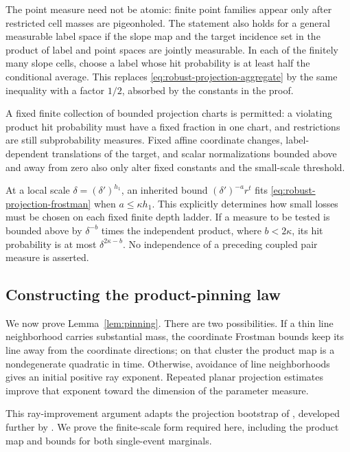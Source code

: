 \begin{remark}
\label{rem:robust-projection-extensions}
The point measure need not be atomic: finite point families
appear only after restricted cell masses are pigeonholed. The
statement also holds for a general measurable label space if
the slope map and the target incidence set in the product of
label and point spaces are jointly measurable. In each of the
finitely many slope cells, choose a label whose hit probability
is at least half the conditional average. This replaces
\eqref{eq:robust-projection-aggregate} by the same inequality
with a factor $1/2$, absorbed by the constants in the proof.

A fixed finite collection of bounded projection charts is
permitted: a violating product hit probability must have a
fixed fraction in one chart, and restrictions are still
subprobability measures. Fixed affine coordinate changes,
label-dependent translations of the target, and scalar
normalizations bounded above and away from zero also only
alter fixed constants and the small-scale threshold.

At a local scale $\delta=(\delta')^{h_1}$, an inherited bound
$(\delta')^{-a}r^t$ fits
\eqref{eq:robust-projection-frostman} when $a\le\kappa h_1$.
This explicitly determines how small losses must be chosen
on each fixed finite depth ladder. If a measure to be tested
is bounded above by $\delta^{-b}$ times the independent product,
where $b<2\kappa$, its hit probability is at most
$\delta^{2\kappa-b}$. No independence of a preceding coupled
pair measure is asserted.
\end{remark}


\subsection{Constructing the product-pinning law}
\label{sec:product-pinning-proof}

We now prove Lemma~\ref{lem:pinning}. There are two possibilities.
If a thin line neighborhood carries substantial mass, the coordinate
Frostman bounds keep its line away from the coordinate directions;
on that cluster the product map is a nondegenerate quadratic in time.
Otherwise, avoidance of line neighborhoods gives an initial positive
ray exponent. Repeated planar projection estimates improve that
exponent toward the dimension of the parameter measure.

This ray-improvement argument adapts the projection bootstrap of
\citet{SW2025}, developed further by \citet{OSW2024}. We prove the finite-scale
form required here, including the product map and bounds for both
single-event marginals.

